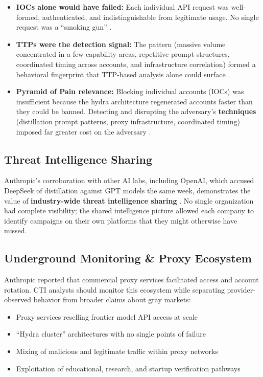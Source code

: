 \documentclass[11pt,a4paper]{article}
\begin{document}
\begin{itemize}[leftmargin=20pt, noitemsep]
    \item \textbf{IOCs alone would have failed:} Each individual API request was well-formed, authenticated, and indistinguishable from legitimate usage. No single request was a ``smoking gun'' \cite{treblle}.
    \item \textbf{TTPs were the detection signal:} The pattern (massive volume concentrated in a few capability areas, repetitive prompt structures, coordinated timing across accounts, and infrastructure correlation) formed a behavioral fingerprint that TTP-based analysis alone could surface \cite{anthropic_blog}\cite{treblle}.
    \item \textbf{Pyramid of Pain relevance:} Blocking individual accounts (IOCs) was insufficient because the hydra architecture regenerated accounts faster than they could be banned. Detecting and disrupting the adversary's \textbf{techniques} (distillation prompt patterns, proxy infrastructure, coordinated timing) imposed far greater cost on the adversary \cite{treblle}.
\end{itemize}

\subsection{Threat Intelligence Sharing}

Anthropic's corroboration with other AI labs, including OpenAI, which accused DeepSeek of distillation against GPT models the same week, demonstrates the value of \textbf{industry-wide threat intelligence sharing} \cite{anthropic_blog}\cite{cnbc}\cite{linkedin_keltner}. No single organization had complete visibility; the shared intelligence picture allowed each company to identify campaigns on their own platforms that they might otherwise have missed.

\subsection{Underground Monitoring \& Proxy Ecosystem}

Anthropic reported that commercial proxy services facilitated access and account rotation. CTI analysts should monitor this ecosystem while separating provider-observed behavior from broader claims about gray markets:

\begin{itemize}[leftmargin=20pt, noitemsep]
    \item Proxy services reselling frontier model API access at scale
    \item ``Hydra cluster'' architectures with no single points of failure
    \item Mixing of malicious and legitimate traffic within proxy networks
    \item Exploitation of educational, research, and startup verification pathways
\end{itemize}
\end{document}
